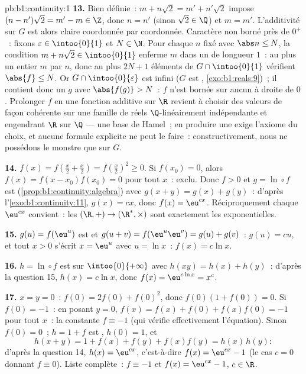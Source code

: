 \begin{solution}{pb:b1:continuity:1}
\textbf{13.} Bien définie~: $m + n\sqrt2 = m' + n'\sqrt2$ impose
$(n - n')\sqrt2 = m' - m \in \Z$, donc $n = n'$ (sinon $\sqrt2 \in
\Q$) et $m = m'$. L'additivité sur $G$ est alors claire coordonnée par
coordonnée. Caractère non borné près de $0^+$~: fixons $\varepsilon \in
\intoo{0}{1}$ et $N \in \N$. Pour chaque $n$ fixé avec $\abs n
\leq N$, la condition $m + n\sqrt2 \in \intoo{0}{1}$ enferme $m$
dans un  de longueur $1$~: au plus un entier $m$ par
$n$, donc au plus $2N + 1$ éléments de $G \cap \intoo{0}{1}$ vérifient
$\abs{f} \leq N$. Or $G \cap \intoo{0}{\varepsilon}$ est
infini ($G$ est , \cref{exo:b1:reals:9})~; il contient donc
un $g$ avec $\abs{f(g)} > N$~: $f$ n'est bornée sur aucun  à
droite de $0$. Prolonger $f$ en une fonction additive sur $\R$ revient
à choisir des valeurs de façon cohérente sur une famille de réels
$\Q$-linéairement indépendante et engendrant $\R$ sur $\Q$
--- une base de Hamel~; en produire une exige l'axiome du choix,
et aucune formule explicite ne peut le faire~: constructivement, nous
ne possédons le monstre que sur $G$.

\textbf{14.} $f(x) = f(\frac x2 + \frac x2) = f(\frac x2)^2 \geq
0$. Si $f(x_0) = 0$, alors $f(x) = f(x - x_0)f(x_0) = 0$ pour tout
$x$~: exclu. Donc $f > 0$ et $g = \ln \circ f$ est 
(\cref{prop:b1:continuity:algebra}) avec $g(x + y) = g(x) +
g(y)$~: d'après l'\cref{exo:b1:continuity:11}, $g(x) = cx$, donc $f(x)
= \eu^{cx}$. Réciproquement chaque $\eu^{cx}$ convient~: les
  $(\R, +) \to (\R^*, \times)$ sont exactement les
exponentielles.

\textbf{15.} $g(u) = f(\eu^u)$ est  et $g(u + v) =
f(\eu^u \eu^v) = g(u) + g(v)$~: $g(u) = cu$, et tout $x > 0$
s'écrit $x = \eu^u$ avec $u = \ln x$~: $f(x) = c\ln x$.

\textbf{16.} $h = \ln \circ f$ est  sur
$\intoo{0}{+\infty}$ avec $h(xy) = h(x) + h(y)$~: d'après la question
15, $h(x) = c\ln x$, donc $f(x) = \eu^{c\ln x} = x^c$.

\textbf{17.} $x = y = 0$~: $f(0) = 2f(0) + f(0)^2$, donc $f(0)(1 +
f(0)) = 0$. Si $f(0) = -1$~: en posant $y = 0$, $f(x) = f(x) +
f(0) + f(x)f(0) = -1$ pour tout $x$~: la constante $f \equiv -1$
(qui vérifie effectivement l'équation). Sinon $f(0) = 0$~; $h
= 1 + f$ est , $h(0) = 1$, et
\[
h(x + y) = 1 + f(x) + f(y) + f(x)f(y) = h(x)\,h(y) :
\]
d'après la question 14, $h(x) = \eu^{cx}$, c'est-à-dire $f(x) =
\eu^{cx} - 1$ (le cas $c = 0$ donnant $f \equiv 0$). Liste complète~:
$f \equiv -1$ et $f(x) = \eu^{cx} - 1$, $c \in \R$.


\end{solution}
